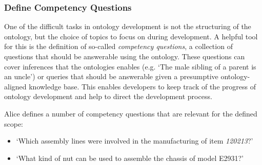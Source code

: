 \subsubsection{Define Competency Questions}
\label{Define_Competency_Questions}

One of the difficult tasks in ontology development is not the structuring of the ontology, but the choice of topics to focus on during development. A helpful tool for this is the definition of so-called \textit{competency questions}, a collection of questions that should be answerable using the ontology. 
These questions can cover inferences that the ontologies enables (e.g. `The male sibling of a parent is an uncle') or queries that should be answerable given a presumptive ontology-aligned knowledge base. This enables developers to keep track of the progress of ontology development and help to direct the development process. 


\begin{example}
Alice defines a number of competency questions that are relevant for the defined scope:
\begin{itemize}
    \item `Which assembly lines were involved in the manufacturing of item \textit{120213}?'
    \item `What kind of nut can be used to assemble the chassis of model E2931?'
\end{itemize}

\end{example}